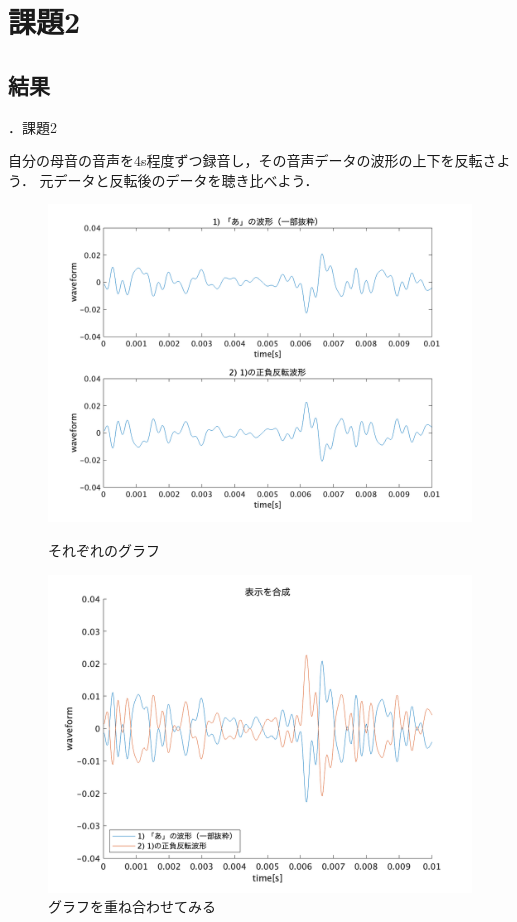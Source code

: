 \documentclass[aspectratio=43]{beamer}
\newcommand{\showsec}{\thesection ．}
\begin{document}
\section{課題2}
\subsection{結果}
\begin{frame}[t]{\showsec 課題2}
    \begin{exampleblock}{}
        自分の母音の音声を4s程度ずつ録音し，その音声データの波形の上下を反転さよう．
        元データと反転後のデータを聴き比べよう．
    \end{exampleblock}
    \begin{figure}
        \centering
        \begin{minipage}[t]{0.49\textwidth}
            \centering
            \includegraphics[keepaspectratio,width=\textwidth]{no2_ans_1.png}
            \caption{それぞれのグラフ}
        \end{minipage}
        \begin{minipage}[t]{0.49\textwidth}
            \centering
            \includegraphics[keepaspectratio,width=\textwidth]{no2_ans_2.png}
            \caption{グラフを重ね合わせてみる}
        \end{minipage}
    \end{figure}
\end{frame}
\end{document}

